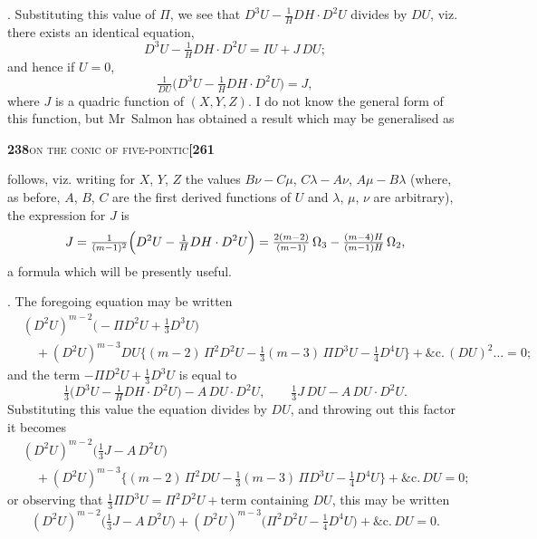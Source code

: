 \documentclass[11pt]{article}
\begin{document}
\medskip

. Substituting this value of $\Pi$, we see that $D^3 U - \tfrac{1}{H} DH\cdot D^2 U$ divides by $DU$, viz. there exists an identical equation,
\[
  D^3 U - \tfrac{1}{H} DH\cdot D^2 U = I U + J\,DU;
\]
and hence if $U = 0$,
\[
  \tfrac{1}{DU}\bigl(D^3 U - \tfrac{1}{H} DH\cdot D^2 U\bigr) = J,
\]
where $J$ is a quadric function of $(X, Y, Z)$. I do not know the general form of this function, but Mr~Salmon has obtained a result which may be generalised as

\newpage
\noindent\textbf{238}\hfill\textsc{on the conic of five-pointic}\hfill\textbf{[261}

\medskip

\noindent follows, viz. writing for $X$, $Y$, $Z$ the values $B\nu - C\mu$, $C\lambda - A\nu$, $A\mu - B\lambda$ (where, as before, $A$, $B$, $C$ are the first derived functions of $U$ and $\lambda$, $\mu$, $\nu$ are arbitrary), the expression for $J$ is
\[
  J = \tfrac{1}{(m-1)^2}\Bigl( D^2 U - \tfrac{1}{H} DH\cdot D^2 U \Bigr) = \tfrac{2(m - 2)}{(m - 1)}\,\Omega_3 - \tfrac{(m - 4) H}{(m - 1) H}\,\Omega_2,
\]
a formula which will be presently useful.

\medskip

. The foregoing equation may be written
\[
\begin{aligned}
  &(D^2 U)^{m-2}\bigl(-\Pi D^2 U + \tfrac{1}{3} D^3 U\bigr)\\
  &\quad + (D^2 U)^{m-3} DU\bigl\{(m - 2)\,\Pi^2 D^2 U - \tfrac{1}{3}(m - 3)\,\Pi D^3 U - \tfrac{1}{4} D^4 U\bigr\} + \&\text{c.}\,(DU)^2 \ldots = 0;
\end{aligned}
\]
and the term $-\Pi D^2 U + \tfrac{1}{3} D^3 U$ is equal to
\[
  \tfrac{1}{3}\bigl(D^3 U - \tfrac{1}{H} DH\cdot D^2 U\bigr) - A\,DU\cdot D^2 U, \qquad \tfrac{1}{3} J\,DU - A\,DU\cdot D^2 U.
\]
Substituting this value the equation divides by $DU$, and throwing out this factor it becomes
\[
\begin{aligned}
  &(D^2 U)^{m-2}\bigl(\tfrac{1}{3} J - A\,D^2 U\bigr)\\
  &\quad + (D^2 U)^{m-3}\bigl\{(m - 2)\,\Pi^2 DU - \tfrac{1}{3}(m - 3)\,\Pi D^3 U - \tfrac{1}{4} D^4 U\bigr\} + \&\text{c.}\,DU = 0;
\end{aligned}
\]
or observing that $\tfrac{1}{3}\Pi D^3 U = \Pi^2 D^2 U + \text{term containing } DU$, this may be written
\[
  (D^2 U)^{m-2}\bigl(\tfrac{1}{3} J - A\,D^2 U\bigr) + (D^2 U)^{m-3}\bigl(\Pi^2 D^2 U - \tfrac{1}{4} D^4 U\bigr) + \&\text{c.}\,DU = 0.
\]
\end{document}
